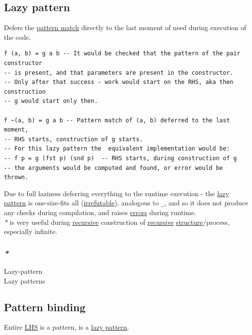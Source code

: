 \documentclass[a4paper,14pt,oneside]{book}
\begin{document}
\subsection{\label{org6c7e874}Lazy pattern}
\label{sec:orga20f732}
Defers the \hyperref[orga94283a]{pattern match} directly to the last moment of need during execution of the code.\\

\begin{verbatim}
f (a, b) = g a b -- It would be checked that the pattern of the pair constructor
-- is present, and that parameters are present in the constructor.
-- Only after that success - work would start on the RHS, aka then construction
-- g would start only then.

f ~(a, b) = g a b -- Pattern match of (a, b) deferred to the last moment,
-- RHS starts, construction of g starts.
-- For this lazy pattern the  equivalent implementation would be:
-- f p = g (fst p) (snd p)  -- RHS starts, during construction of g
-- the arguments would be computed and found, or error would be thrown.
\end{verbatim}

Due to full laziness deferring everything to the runtime execution - the \hyperref[org6c7e874]{lazy pattern} is one-size-fits all (\hyperref[orgaedb44e]{irrefutable}), analogous to \texttt{\_}, and so it does not produce any checks during compilation, and raises \hyperref[orgd4f9602]{errors} during runtime.\\

\emph{*} is very useful during \hyperref[org87b7fa9]{recursive} construction of \hyperref[org87b7fa9]{recursive} \hyperref[orgc6baf3c]{structure}/process, especially infinite.\\

\subsubsection{\emph{*}}
\label{sec:orgc9f642a}

\label{orgd886d13}Lazy-pattern\\
\label{org4111388}Lazy patterns\\

\subsection{\label{org6d20c40}Pattern binding}
\label{sec:orgb275031}
Entire \hyperref[org1013490]{LHS} is a pattern, is a \hyperref[org6c7e874]{lazy pattern}.\\
\end{document}
